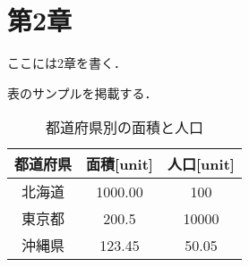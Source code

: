 \section{第2章}
\label{sec:2}

ここには2章を書く．

表のサンプルを掲載する．

\newpage
\begin{table}[b]
    \centering
    \caption{都道府県別の面積と人口}
    \label{tab:todofuken}
    \begin{tabular}{@{}cSS@{}}
    \toprule
    都道府県 & 面積{[}unit{]} & 人口{[}unit{]} \\ \midrule
    北海道  & 1000.00      & 100          \\
    東京都  & 200.5        & 10000        \\
    沖縄県  & 123.45       & 50.05        \\ \bottomrule
    \end{tabular}
\end{table}

